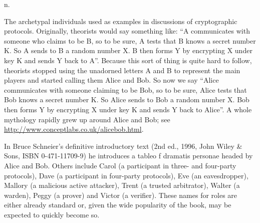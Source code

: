  n.

The archetypal individuals used as examples in discussions of cryptographic
protocols. Originally, theorists would say something like: ``A communicates
with someone who claims to be B, so to be sure, A tests that B knows a secret
number K. So A sends to B a random number X. B then forms Y by encrypting X
under key K and sends Y back to A''. Because this sort of thing is quite hard
to follow, theorists stopped using the unadorned letters A and B to represent
the main players and started calling them Alice and Bob. So now we say ``Alice
communicates with someone claiming to be Bob, so to be sure, Alice tests that
Bob knows a secret number K. So Alice sends to Bob a random number X. Bob then
forms Y by encrypting X under key K and sends Y back to Alice''. A whole
mythology rapidly grew up around Alice and Bob; see
\url{http://www.conceptlabs.co.uk/alicebob.html}.

In Bruce Schneier's definitive introductory text  (2nd ed., 1996, John Wiley \& Sons, ISBN 0-471-11709-9) he
introduces a tableo f dramatis personae headed by Alice and Bob. Others include
Carol (a participant in three- and four-party protocols), Dave (a participant
in four-party protocols), Eve (an eavesdropper), Mallory (a malicious active
attacker), Trent (a trusted arbitrator), Walter (a warden), Peggy (a prover)
and Victor (a verifier). These names for roles are either already standard or,
given the wide popularity of the book, may be expected to quickly become so.  

